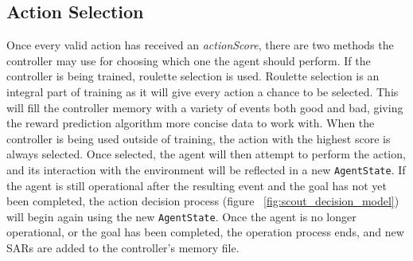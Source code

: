 

\subsection{Action Selection}
Once every valid action has received an \textit{actionScore}, there are two methods the controller may use for choosing which one the agent should perform.
If the controller is being trained, roulette selection is used.
Roulette selection is an integral part of training as it will give every action a chance to be selected.
This will fill the controller memory with a variety of events both good and bad, giving the reward prediction algorithm more concise data to work with.
When the controller is being used outside of training, the action with the highest score is always selected.
Once selected, the agent will then attempt to perform the action, and its interaction with the environment will be reflected in a new \texttt{AgentState}.
If the agent is still operational after the resulting event and the goal has not yet been completed, the action decision process (figure ~\ref{fig:scout_decision_model}) will begin again using the new \texttt{AgentState}.
Once the agent is no longer operational, or the goal has been completed, the operation process ends, and new SARs are added to the controller's memory file.







